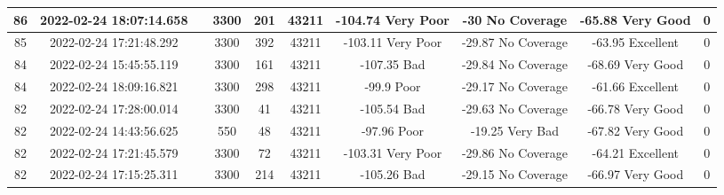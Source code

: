 \begin{longtable*}{|c|c|c|c|c|c|c|c|c|c|}
86&2022-02-24 18:07:14.658&&3300&201&43211& -104.74   Very Poor   & -30       No Coverage & -65.88    Very Good   & 0\\\hline
{}85&2022-02-24 17:21:48.292&&3300&392&43211& -103.11   Very Poor   & -29.87    No Coverage & -63.95    Excellent   & 0\\\hline
{}84&2022-02-24 15:45:55.119&&3300&161&43211& -107.35   Bad         & -29.84    No Coverage & -68.69    Very Good   & 0\\\hline
{}84&2022-02-24 18:09:16.821&&3300&298&43211& -99.9     Poor        & -29.17    No Coverage & -61.66    Excellent   & 0\\\hline
{}82&2022-02-24 17:28:00.014&&3300&41&43211& -105.54   Bad         & -29.63    No Coverage & -66.78    Very Good   & 0\\\hline
{}82&2022-02-24 14:43:56.625&&550&48&43211& -97.96    Poor        & -19.25    Very Bad    & -67.82    Very Good   & 0\\\hline
{}82&2022-02-24 17:21:45.579&&3300&72&43211& -103.31   Very Poor   & -29.86    No Coverage & -64.21    Excellent   & 0\\\hline
{}82&2022-02-24 17:15:25.311&&3300&214&43211& -105.26   Bad         & -29.15    No Coverage & -66.97    Very Good   & 0\\\hline

\end{longtable*}

